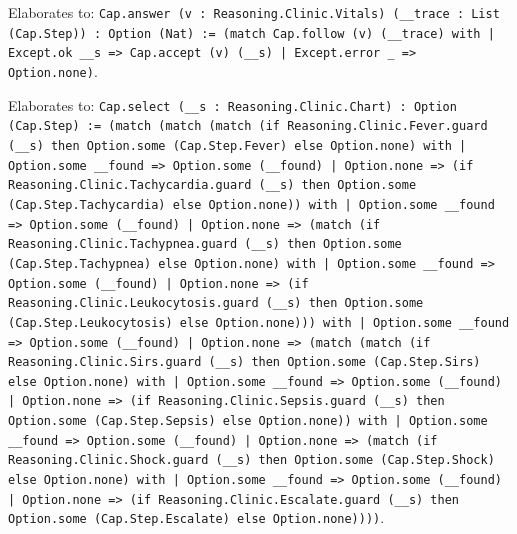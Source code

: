 \documentclass[11pt]{article}
\begin{document}
\noindent Elaborates to: \texttt{Cap.answer (v : Reasoning.Clinic.Vitals) (\_\_trace : List (Cap.Step)) : Option (Nat) := (match Cap.follow (v) (\_\_trace) with | Except.ok \_\_s => Cap.accept (v) (\_\_s) | Except.error \_ => Option.none)}.\par
\noindent Elaborates to: \texttt{Cap.select (\_\_s : Reasoning.Clinic.Chart) : Option (Cap.Step) := (match (match (match (if Reasoning.Clinic.Fever.guard (\_\_s) then Option.some (Cap.Step.Fever) else Option.none) with | Option.some \_\_found => Option.some (\_\_found) | Option.none => (if Reasoning.Clinic.Tachycardia.guard (\_\_s) then Option.some (Cap.Step.Tachycardia) else Option.none)) with | Option.some \_\_found => Option.some (\_\_found) | Option.none => (match (if Reasoning.Clinic.Tachypnea.guard (\_\_s) then Option.some (Cap.Step.Tachypnea) else Option.none) with | Option.some \_\_found => Option.some (\_\_found) | Option.none => (if Reasoning.Clinic.Leukocytosis.guard (\_\_s) then Option.some (Cap.Step.Leukocytosis) else Option.none))) with | Option.some \_\_found => Option.some (\_\_found) | Option.none => (match (match (if Reasoning.Clinic.Sirs.guard (\_\_s) then Option.some (Cap.Step.Sirs) else Option.none) with | Option.some \_\_found => Option.some (\_\_found) | Option.none => (if Reasoning.Clinic.Sepsis.guard (\_\_s) then Option.some (Cap.Step.Sepsis) else Option.none)) with | Option.some \_\_found => Option.some (\_\_found) | Option.none => (match (if Reasoning.Clinic.Shock.guard (\_\_s) then Option.some (Cap.Step.Shock) else Option.none) with | Option.some \_\_found => Option.some (\_\_found) | Option.none => (if Reasoning.Clinic.Escalate.guard (\_\_s) then Option.some (Cap.Step.Escalate) else Option.none))))}.\par
\end{document}

